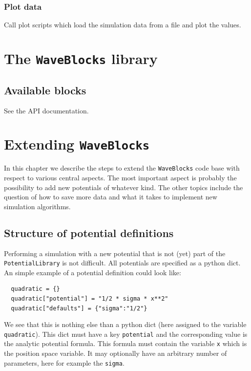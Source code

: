 \documentclass[a4paper,10pt]{report}
\begin{document}
\subsection{Plot data}

Call plot scripts which load the simulation data from a file and plot the values.



\chapter{The \texttt{WaveBlocks} library}

\section{Available blocks}

See the API documentation.


\chapter{Extending \texttt{WaveBlocks}}

In this chapter we describe the steps to extend the \texttt{WaveBlocks}
code base with respect to various central aspects. The most important aspect
is probably the possibility to add new potentials of whatever kind. The other
topics include the question of how to save more data and what it takes to
implement new simulation algorithms.

\section{Structure of potential definitions}

Performing a simulation with a new potential that is not (yet) part of the
\texttt{PotentialLibrary} is not difficult. All potentials are specified
as a python dict. An simple example of a potential definition could look like:

\begin{verbatim}
  quadratic = {}
  quadratic["potential"] = "1/2 * sigma * x**2"
  quadratic["defaults"] = {"sigma":"1/2"}
\end{verbatim}

We see that this is nothing else than a python dict (here assigned to the
variable \texttt{quadratic}). This dict must have a key \texttt{potential}
and the corresponding value is the analytic potential formula. This formula
must contain the variable \texttt{x} which is the position space variable.
It may optionally have an arbitrary number of parameters, here for example
the \texttt{sigma}.
\end{document}
